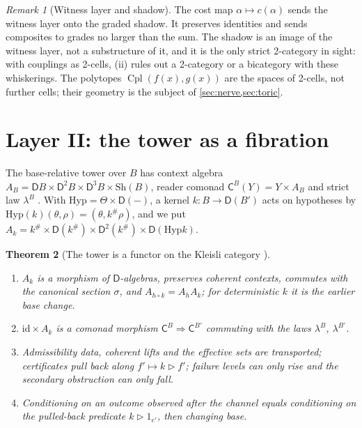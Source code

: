 \documentclass[11pt]{article}
\newtheorem{theorem}{Theorem}[section]
\theoremstyle{definition}
\theoremstyle{remark}
\newtheorem{remark}[theorem]{Remark}
\newcommand{\D}{\mathsf{D}}
\newcommand{\Cpl}{\operatorname{Cpl}}
\newcommand{\Hyp}{\mathrm{Hyp}}
\newcommand{\Sh}{\mathrm{Sh}}
\newcommand{\C}{\mathsf{C}}
\newcommand{\id}{\mathrm{id}}
\begin{document}
\begin{remark}[Witness layer and shadow]\label{rem:shadow}
The cost map $\alpha\mapsto c(\alpha)$ sends the witness layer onto the graded shadow. It preserves identities and
sends composites to grades no larger than the sum. The shadow is an image of the witness layer, not a
substructure of it, and it is the only strict 2-category in sight: with couplings as 2-cells, (ii) rules out a
2-category or a bicategory with these whiskerings. The polytopes $\Cpl(f(x),g(x))$ are the spaces of 2-cells, not
further cells; their geometry is the subject of \cref{sec:nerve,sec:toric}.
\end{remark}

\section{Layer II: the tower as a fibration}\label{sec:fibre}

The base-relative tower over $B$ has context algebra $A_B=\D B\times\D^2B\times\D^3B\times\Sh(B)$,
reader comonad $\C^B(Y)=Y\times A_B$ and strict law $\lambda^B$ \cite[\S9]{Awasthi-Tower}. With
$\Hyp=\Theta\times\D(-)$, a kernel $k\colon B\to\D(B')$ acts on hypotheses by
$\Hyp(k)(\theta,\rho)=(\theta,k^\#\rho)$, and we put
$A_k=k^\#\times\D(k^\#)\times\D^2(k^\#)\times\D(\Hyp k)$.

\begin{theorem}[The tower is a functor on the Kleisli category {\cite[Prop.~9.14, Cor.~9.15, Prop.~9.16]{Awasthi-Tower}}]\label{thm:fibre}
\leavevmode
\begin{enumerate}[label=(\roman*)]
\item $A_k$ is a morphism of $\D$-algebras, preserves coherent contexts, commutes with the canonical
  section $\sigma$, and $A_{h\circ k}=A_hA_k$; for deterministic $k$ it is the earlier base change.
\item $\id\times A_k$ is a comonad morphism $\C^B\Rightarrow\C^{B'}$ commuting with the laws $\lambda^B$,
  $\lambda^{B'}$.
\item Admissibility data, coherent lifts and the effective sets are transported; certificates pull
  back along $f'\mapsto k\rhd f'$; failure levels can only rise and the secondary obstruction can only
  fall.
\item Conditioning on an outcome observed after the channel equals conditioning on the pulled-back
  predicate $k\rhd1_{e'}$, then changing base.
\end{enumerate}
\end{theorem}
\end{document}
